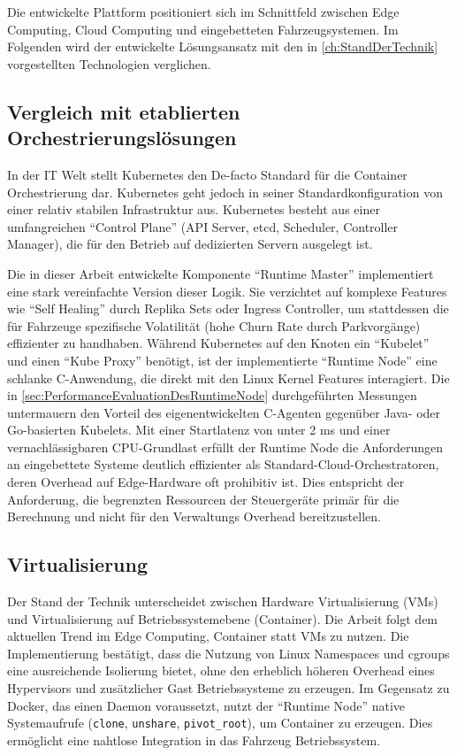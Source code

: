 Die entwickelte Plattform positioniert sich im Schnittfeld zwischen Edge Computing, Cloud Computing und eingebetteten Fahrzeugsystemen. Im Folgenden wird der entwickelte Lösungsansatz mit den in \autoref{ch:StandDerTechnik} vorgestellten Technologien verglichen.

\subsection{Vergleich mit etablierten Orchestrierungslösungen}
In der IT Welt stellt Kubernetes den De-facto Standard für die Container Orchestrierung dar. Kubernetes geht jedoch in seiner Standardkonfiguration von einer relativ stabilen Infrastruktur aus. Kubernetes besteht aus einer umfangreichen \enquote{Control Plane} (API Server, etcd, Scheduler, Controller Manager), die für den Betrieb auf dedizierten Servern ausgelegt ist. 

Die in dieser Arbeit entwickelte Komponente \enquote{Runtime Master} implementiert eine stark vereinfachte Version dieser Logik. Sie verzichtet auf komplexe Features wie \enquote{Self Healing} durch Replika Sets oder Ingress Controller, um stattdessen die für Fahrzeuge spezifische Volatilität (hohe Churn Rate durch Parkvorgänge) effizienter zu handhaben. Während Kubernetes auf den Knoten ein \enquote{Kubelet} und einen \enquote{Kube Proxy} benötigt, ist der implementierte \enquote{Runtime Node} eine schlanke C-Anwendung, die direkt mit den Linux Kernel Features interagiert. Die in \autoref{sec:PerformanceEvaluationDesRuntimeNode} durchgeführten Messungen untermauern den Vorteil des eigenentwickelten C-Agenten gegenüber Java- oder Go-basierten Kubelets. Mit einer Startlatenz von unter 2 ms und einer vernachlässigbaren CPU-Grundlast erfüllt der Runtime Node die Anforderungen an eingebettete Systeme deutlich effizienter als Standard-Cloud-Orchestratoren, deren Overhead auf Edge-Hardware oft prohibitiv ist. Dies entspricht der Anforderung, die begrenzten Ressourcen der Steuergeräte primär für die Berechnung und nicht für den Verwaltungs Overhead bereitzustellen.

\subsection{Virtualisierung}
Der Stand der Technik unterscheidet zwischen Hardware Virtualisierung (VMs) und Virtualisierung auf Betriebssystemebene (Container). Die Arbeit folgt dem aktuellen Trend im Edge Computing, Container statt VMs zu nutzen. Die Implementierung bestätigt, dass die Nutzung von Linux Namespaces und cgroups eine ausreichende Isolierung bietet, ohne den erheblich höheren Overhead eines Hypervisors und zusätzlicher Gast Betriebssysteme zu erzeugen. Im Gegensatz zu Docker, das einen Daemon voraussetzt, nutzt der \enquote{Runtime Node} native Systemaufrufe (\texttt{clone}, \texttt{unshare}, \texttt{pivot\_root}), um Container zu erzeugen. Dies ermöglicht eine nahtlose Integration in das Fahrzeug Betriebssystem.

